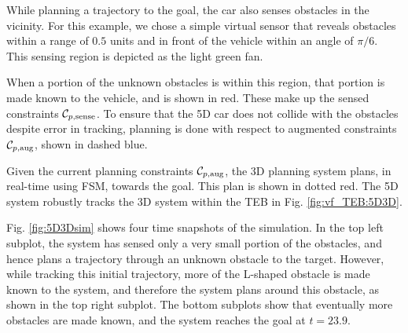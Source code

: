 While planning a trajectory to the goal, the car also senses obstacles in the vicinity.
For this example, we chose a simple virtual sensor that reveals obstacles within a range of $0.5$ units and in front of the vehicle within an angle of $\pi/6$.
This sensing region is depicted as the light green fan.

When a portion of the unknown obstacles is within this region, that portion is made known to the vehicle, and is shown in red.
These make up the sensed constraints $\mathcal C_{p,\text{sense}}$.
To ensure that the 5D car does not collide with the obstacles despite error in tracking, planning is done with respect to augmented constraints $\mathcal C_{p,\text{aug}}$, shown in dashed blue.

Given the current planning constraints $\mathcal C_{p,\text{aug}}$, the 3D planning system plans, in real-time using FSM, towards the goal.
This plan is shown in dotted red.
The 5D system robustly tracks the 3D system within the TEB in Fig. \ref{fig:vf_TEB:5D3D}.

Fig. \ref{fig:5D3Dsim} shows four time snapshots of the simulation.
In the top left subplot, the system has sensed only a very small portion of the obstacles, and hence plans a trajectory through an unknown obstacle to the target.
However, while tracking this initial trajectory, more of the L-shaped obstacle is made known to the system, and therefore the system plans around this obstacle, as shown in the top right subplot.
The bottom subplots show that eventually more obstacles are made known, and the system reaches the goal at $t=23.9$.


